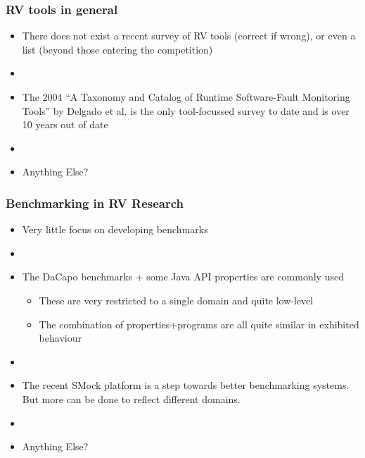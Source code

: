 \documentclass{beamer}
\newcommand{\addhere}{{\color{red} Anything Else?}}
\begin{document}
\begin{frame}
\frametitle{RV tools in general}
\begin{itemize}
	\item There does not exist a recent survey of RV tools (correct if wrong), or even a list (beyond those entering the competition)
	\item[]
	\item The 2004 ``A Taxonomy and Catalog of Runtime Software-Fault Monitoring Tools'' by Delgado et al. is the only tool-focussed survey to date and is over 10 years out of date
	\item[]
	\item \addhere{}
\end{itemize}
\end{frame}

\begin{frame}
\frametitle{Benchmarking in RV Research}
\begin{itemize}
	\item Very little focus on developing benchmarks
	\item[]
	\item The DaCapo benchmarks + some Java API properties are commonly used
	\begin{itemize}
		\item These are very restricted to a single domain and quite low-level
		\item The combination of properties+programs are all quite similar in exhibited behaviour
	\end{itemize}
	\item[]
	\item The recent SMock platform is a step towards better benchmarking systems. But more can be done to reflect different domains.
	\item[]
	\item \addhere{}
\end{itemize}
\end{frame}
\end{document}
